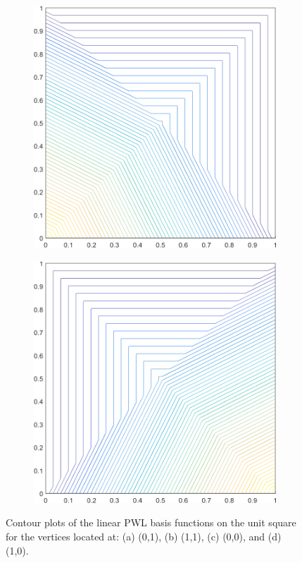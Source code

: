 \begin{figure}
\begin{subfigure}[b]{0.39\textwidth}
		\caption{}
	\end{subfigure}
	\vfill
	\begin{subfigure}[b]{0.39\textwidth}
		\centering
		\includegraphics[width=\textwidth]{figures/sec_BF/square_PWLD1_contour_b1.png}
		\caption{}
	\end{subfigure}
	\hspace{1.5cm}
	\begin{subfigure}[b]{0.39\textwidth}
		\centering
		\includegraphics[width=\textwidth]{figures/sec_BF/square_PWLD1_contour_b2.png}
		\caption{}
	\end{subfigure}
\caption{Contour plots of the linear PWL basis functions on the unit square for the vertices located at: (a) (0,1), (b) (1,1), (c) (0,0), and (d) (1,0).}
\end{figure}

